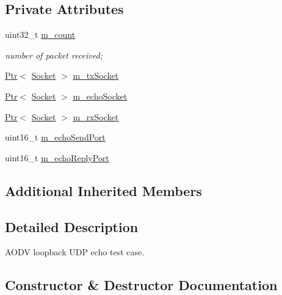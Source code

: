 \subsection*{Private Attributes}
\begin{DoxyCompactItemize}
\item 
uint32\+\_\+t \hyperlink{classns3_1_1aodv_1_1LoopbackTestCase_af09bb519a38083fa17fc3560b46f480a}{m\+\_\+count}
\begin{DoxyCompactList}\small\item\em number of packet received; \end{DoxyCompactList}\item 
\hyperlink{classns3_1_1Ptr}{Ptr}$<$ \hyperlink{classns3_1_1Socket}{Socket} $>$ \hyperlink{classns3_1_1aodv_1_1LoopbackTestCase_ac0309c6d4ff6068bfba865f083d08794}{m\+\_\+tx\+Socket}
\item 
\hyperlink{classns3_1_1Ptr}{Ptr}$<$ \hyperlink{classns3_1_1Socket}{Socket} $>$ \hyperlink{classns3_1_1aodv_1_1LoopbackTestCase_adf492280babba2c4c98396fc78e87ad3}{m\+\_\+echo\+Socket}
\item 
\hyperlink{classns3_1_1Ptr}{Ptr}$<$ \hyperlink{classns3_1_1Socket}{Socket} $>$ \hyperlink{classns3_1_1aodv_1_1LoopbackTestCase_a18dd2548f7060a7d151df5cffb675288}{m\+\_\+rx\+Socket}
\item 
uint16\+\_\+t \hyperlink{classns3_1_1aodv_1_1LoopbackTestCase_a7a72ecf604976b2c7cc6d4e1018c6edd}{m\+\_\+echo\+Send\+Port}
\item 
uint16\+\_\+t \hyperlink{classns3_1_1aodv_1_1LoopbackTestCase_ad168f9d1795693e634c9bed3f0a58f9e}{m\+\_\+echo\+Reply\+Port}
\end{DoxyCompactItemize}
\subsection*{Additional Inherited Members}


\subsection{Detailed Description}
A\+O\+DV loopback U\+DP echo test case. 

\subsection{Constructor \& Destructor Documentation}
